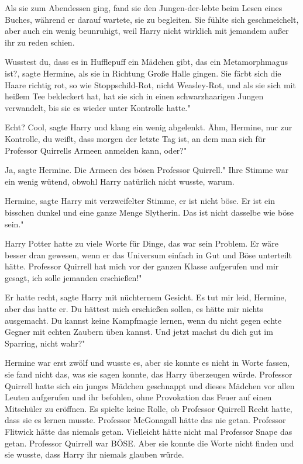 Als sie zum Abendessen ging, fand sie den Jungen-der-lebte beim Lesen eines
Buches, während er darauf wartete, sie zu begleiten. Sie fühlte sich
geschmeichelt, aber auch ein wenig beunruhigt, weil Harry nicht wirklich mit
jemandem außer ihr zu reden schien.

\glqq{}Wusstest du, dass es in Hufflepuff ein Mädchen gibt, das ein
Metamorphmagus ist?\grqq{}, sagte Hermine, als sie in Richtung Große Halle
gingen. \glqq{}Sie färbt sich die Haare richtig rot, so wie Stoppschild-Rot,
nicht Weasley-Rot, und als sie sich mit heißem Tee bekleckert hat, hat sie sich
in einen schwarzhaarigen Jungen verwandelt, bis sie es wieder unter Kontrolle
hatte."

\glqq{}Echt? Cool\grqq{}, sagte Harry und klang ein wenig abgelenkt. \glqq{}Ähm,
Hermine, nur zur Kontrolle, du weißt, dass morgen der letzte Tag ist, an dem man
sich für Professor Quirrells Armeen anmelden kann, oder?"

\glqq{}Ja\grqq{}, sagte Hermine. \glqq{}Die Armeen des bösen Professor Quirrell."
Ihre Stimme war ein wenig wütend, obwohl Harry natürlich nicht wusste, warum.

\glqq{}Hermine\grqq{}, sagte Harry mit verzweifelter Stimme, \glqq{}er ist nicht
böse. Er ist ein bisschen dunkel und eine ganze Menge Slytherin. Das ist nicht
dasselbe wie böse sein."

Harry Potter hatte zu viele Worte für Dinge, das war sein Problem. Er wäre
besser dran gewesen, wenn er das Universum einfach in Gut und Böse unterteilt
hätte. \glqq{}Professor Quirrell hat mich vor der ganzen Klasse aufgerufen und
mir gesagt, ich solle jemanden erschießen!"

\glqq{}Er hatte recht\grqq{}, sagte Harry mit nüchternem Gesicht. \glqq{}Es tut
mir leid, Hermine, aber das hatte er. Du hättest mich erschießen sollen, es
hätte mir nichts ausgemacht. Du kannst keine Kampfmagie lernen, wenn du nicht
gegen echte Gegner mit echten Zaubern üben kannst. Und jetzt machst du dich gut
im Sparring, nicht wahr?"

Hermine war erst zwölf und wusste es, aber sie konnte es nicht in Worte fassen,
sie fand nicht das, was sie sagen konnte, das Harry überzeugen würde. Professor
Quirrell hatte sich ein junges Mädchen geschnappt und dieses Mädchen vor allen
Leuten aufgerufen und ihr befohlen, ohne Provokation das Feuer auf einen
Mitschüler zu eröffnen. Es spielte keine Rolle, ob Professor Quirrell Recht
hatte, dass sie es lernen musste. Professor McGonagall hätte das nie getan.
Professor Flitwick hätte das niemals getan. Vielleicht hätte nicht mal Professor
Snape das getan. Professor Quirrell war BÖSE. Aber sie konnte die Worte nicht
finden und sie wusste, dass Harry ihr niemals glauben würde.

